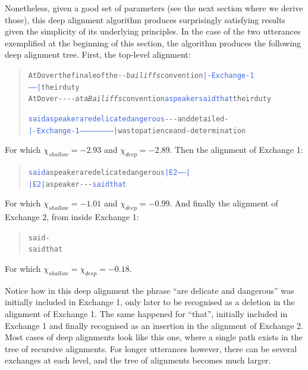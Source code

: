 Nonetheless, given a good set of parameters (see the next section where
we derive those), this deep alignment algorithm produces surprisingly
satisfying results given the simplicity of its underlying principles. In
the case of the two utterances exemplified at the beginning of this
section, the algorithm produces the following deep alignment tree.
First, the top-level alignment:

\begin{quote}\begin{alltt}\small
At Dover \textcolor{BrickRed}{the finale of the} -  - \emph{\textcolor{Sepia}{bailiffs}} convention \textcolor{RoyalBlue}{|-Exchange-1------|} their duty
At Dover -   -      -  -   \textcolor{OliveGreen}{at a} \emph{\textcolor{Sepia}{Bailiffs}} convention \textcolor{RoyalBlue}{a speaker said that} their duty

\textcolor{RoyalBlue}{said a speaker are delicate dangerous} -   -  -        and \textcolor{BrickRed}{detailed} -            
\textcolor{RoyalBlue}{|-Exchange-1------------------------|} \textcolor{OliveGreen}{was to patience} and -        \textcolor{OliveGreen}{determination}
\end{alltt}\end{quote}

For which \(\chi_{shallow} = -2.93\) and \(\chi_{deep} = -2.89\). Then
the alignment of Exchange 1:

\begin{quote}\begin{alltt}\small
\textcolor{RoyalBlue}{said} a speaker \textcolor{BrickRed}{are delicate dangerous} \textcolor{RoyalBlue}{|E2-----|}
\textcolor{RoyalBlue}{|E2|} a speaker -   -        -         \textcolor{RoyalBlue}{said that}
\end{alltt}\end{quote}

For which \(\chi_{shallow} = -1.01\) and \(\chi_{deep} = -0.99\). And
finally the alignment of Exchange 2, from inside Exchange 1:

\begin{quote}\begin{alltt}\small
said -    
said \textcolor{OliveGreen}{that}
\end{alltt}\end{quote}

For which \(\chi_{shallow} = \chi_{deep} = -0.18\).

Notice how in this deep alignment the phrase \enquote{are delicate and
dangerous} was initially included in Exchange 1, only later to be
recognised as a deletion in the alignment of Exchange 1. The same
happened for \enquote{that}, initially included in Exchange 1 and
finally recognised as an insertion in the alignment of Exchange 2. Most
cases of deep alignments look like this one, where a single path exists
in the tree of recursive alignments. For longer utterances however,
there can be several exchanges at each level, and the tree of alignments
becomes much larger.

